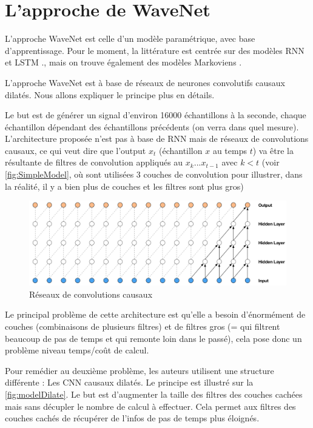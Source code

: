 \documentclass[a4paper]{article}
\begin{document}
\section{L'approche de WaveNet}

L'approche WaveNet est celle d'un modèle paramétrique, avec base d'apprentissage. Pour le moment, la littérature est centrée sur des modèles RNN et LSTM \cite{DBLP:journals/corr/ZenAEHS16}., mais on trouve également des modèles Markoviens \cite{Raitio:2011:HSS:2209821.2210690}.

L'approche WaveNet est à base de réseaux de neurones convolutifs causaux dilatés. Nous allons expliquer le principe plus en détails.

Le but est de générer un signal d'environ 16000 échantillons à la seconde, chaque échantillon dépendant des échantillons précédents (on verra dans quel mesure).
L'architecture proposée n'est pas à base de RNN mais de réseaux de convolutions causaux, ce qui veut dire que l'output $x_t$ (échantillon $x$ au temps $t$) va être la résultante de filtres de convolution appliqués au $x_k ... x_{t-1}$ avec $k<t$ (voir \autoref{fig:SimpleModel}, où sont utilisées 3 couches de convolution pour illustrer, dans la réalité, il y a bien plus de couches et les filtres sont plus gros)

\begin{figure}[h]
  \includegraphics[scale=0.2]{modelSimple.png}
  \caption{\label{fig:SimpleModel} Réseaux de convolutions causaux}
\end{figure}

Le principal problème de cette architecture est qu'elle a besoin d'énormément de couches (combinaisons de plusieurs filtres) et de filtres gros (= qui filtrent beaucoup de pas de temps et qui remonte loin dans le passé), cela pose donc un problème niveau temps/coût de calcul.

Pour remédier au deuxième problème, les auteurs utilisent une structure différente : Les CNN causaux dilatés. Le principe est illustré sur la \autoref{fig:modelDilate}. Le but est d'augmenter la taille des filtres des couches cachées mais sans décupler le nombre de calcul à effectuer. Cela permet aux filtres des couches cachés de récupérer de l'infos de pas de temps plus éloignés.
\end{document}
